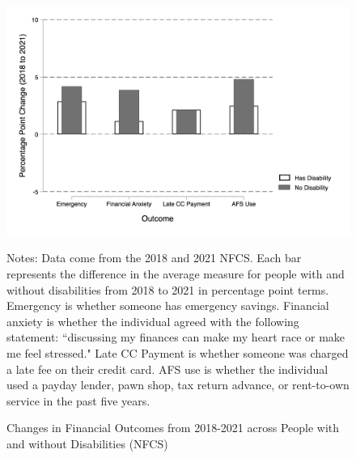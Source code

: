 \documentclass[12pt]{article}
\begin{document}
\begin{figure}[h!]\label{NFCS_Y}
\caption{Changes in Financial Outcomes from 2018-2021 across People with and without Disabilities (NFCS)}
\centering
\includegraphics[scale=0.4]{Exhibits/ChangeY_18_21_NFCSdisabilitynodis.png}
\medskip 
\begin{minipage}{0.65\textwidth} 
{\footnotesize Notes: Data come from the 2018 and 2021 NFCS. Each bar represents the difference in the average measure for people with and without disabilities from 2018 to 2021 in percentage point terms. Emergency is whether someone has emergency savings. Financial anxiety is whether the individual agreed with the following statement: ``discussing my finances can make my heart race or make me feel stressed." Late CC Payment is whether someone was charged a late fee on their credit card. AFS use is whether the individual used a payday lender, pawn shop, tax return advance, or rent-to-own service in the past five years.   \par}
\end{minipage}
\end{figure}
  
\end{document}
